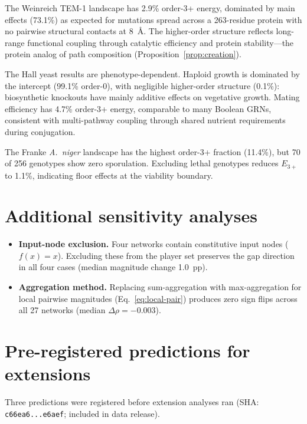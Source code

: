 \documentclass[10pt]{article}
\begin{document}
The Weinreich TEM-1 landscape has 2.9\% order-3+ energy, dominated
by main effects (73.1\%) as expected for mutations spread across a
263-residue protein with no pairwise structural contacts at 8~\AA.
The higher-order structure reflects long-range functional coupling
through catalytic efficiency and protein stability---the protein
analog of path composition (Proposition~\ref{prop:creation}).

The Hall yeast results are phenotype-dependent. Haploid growth is
dominated by the intercept (99.1\% order-0), with negligible
higher-order structure (0.1\%): biosynthetic knockouts have mainly
additive effects on vegetative growth. Mating efficiency has 4.7\%
order-3+ energy, comparable to many Boolean GRNs, consistent with
multi-pathway coupling through shared nutrient requirements during
conjugation.

The Franke \emph{A.~niger} landscape has the highest order-3+
fraction (11.4\%), but 70 of 256 genotypes show zero sporulation.
Excluding lethal genotypes reduces $E_{3+}$ to 1.1\%, indicating
floor effects at the viability boundary.


\section{Additional sensitivity analyses}
\label{supp:sensitivity}

\begin{itemize}
\item \textbf{Input-node exclusion.} Four networks contain
  constitutive input nodes ($f(x) = x$). Excluding these from the
  player set preserves the gap direction in all four cases (median
  magnitude change 1.0~pp).
\item \textbf{Aggregation method.} Replacing sum-aggregation with
  max-aggregation for local pairwise magnitudes
  (Eq.~\ref{eq:local-pair}) produces zero sign flips across all 27
  networks (median $\Delta\rho = -0.003$).
\end{itemize}


\section{Pre-registered predictions for extensions}
\label{supp:prereg}

Three predictions were registered before extension analyses ran
(SHA: \texttt{c66ea6...e6aef}; included in data release).
\end{document}
